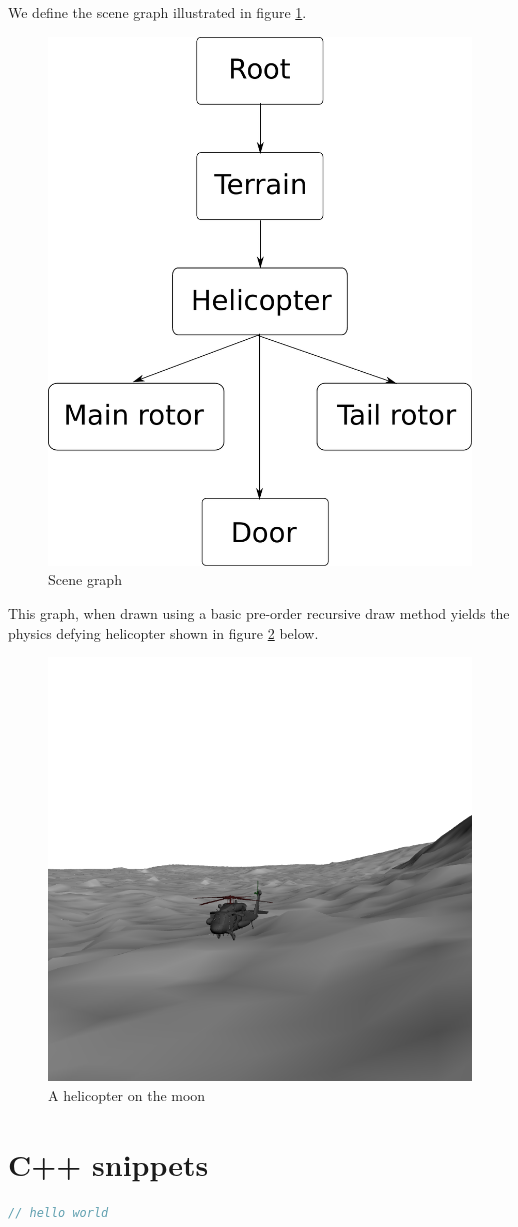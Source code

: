 \documentclass[]{article}
\begin{document}
\begin{multicols}{2}
\section{}
\setcounter{subsection}{2}
\subsection{}
We define the scene graph illustrated in figure \ref{fig:scene-graph}.
\begin{figure}[H]
\centering
\includegraphics[width=0.5\columnwidth]{scenegraph}
\caption{Scene graph}
\label{fig:scene-graph}
\end{figure}
This graph, when drawn using a basic pre-order recursive draw method yields the physics defying helicopter shown in figure \ref{fig:chopper} below.

\begin{figure}[H]
\centering
\includegraphics[width=0.5\columnwidth]{chopper}
\caption{A helicopter on the moon}
\label{fig:chopper}
\end{figure}
\end{multicols}


\appendix
\section{C++ snippets}
\begin{lstlisting}[language={C++}, caption={Vertices for 6 triangles}, label={lst:6_tris_1}]
// hello world
\end{lstlisting}
\end{document}
